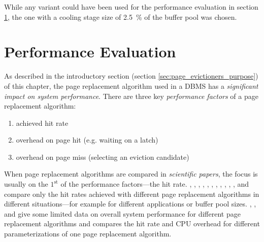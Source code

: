     While any variant could have been used for the performance evaluation in section \ref{sec:page_evictioners_performance_evaluation}, the one with a cooling stage size of \SI{2.5}{\percent} of the buffer pool was chosen.

\section{Performance Evaluation} \label{sec:page_evictioners_performance_evaluation}

    As described in the introductory section (section \ref{sec:page_evictioners_purpose}) of this chapter, the page replacement algorithm used in a DBMS has a \emph{significant impact on system performance}. There are three key \emph{performance factors} of a page replacement algorithm:

    \begin{enumerate}
        \item achieved hit rate
        \item overhead on page hit (e.g. waiting on a latch)
        \item overhead on page miss (selecting an eviction candidate)
    \end{enumerate}

    When page replacement algorithms are compared in \emph{scientific papers}, the focus is usually on the $1^{\text{st}}$ of the performance factors---the hit rate. \cite{Belady:1966}, \cite{Smith:1978}, \cite{Effelsberg:1984}, \cite{ONeil:1993}, \cite{Karedla:1994}, \cite{Johnson:1994}, \cite{Arlitt:2000-1}, \cite{Arlitt:2000-2}, \cite{Jiang:2002}, \cite{Megiddo:2003}, \cite{Bansal:2004}, \cite{Li:2018} and \cite{Li:2019} compare only the hit rates achieved with different page replacement algorithms in different situations---for example for different applications or buffer pool sizes. \cite{Jiang:2005}, \cite{Zhou:2001}, and \cite{Li:2018} give some limited data on overall system performance for different page replacement algorithms and \cite{Corbato:1969} compares the hit rate and CPU overhead for different parameterizations of one page replacement algorithm.


